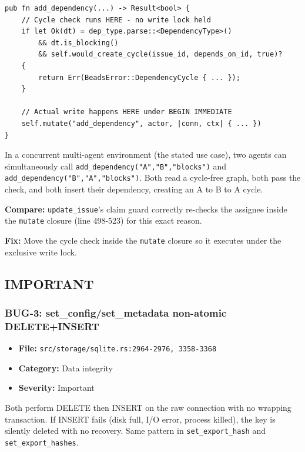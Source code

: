 \documentclass[twocolumn,10pt,letterpaper]{article}
\begin{document}
\begin{lstlisting}
pub fn add_dependency(...) -> Result<bool> {
    // Cycle check runs HERE - no write lock held
    if let Ok(dt) = dep_type.parse::<DependencyType>()
        && dt.is_blocking()
        && self.would_create_cycle(issue_id, depends_on_id, true)?
    {
        return Err(BeadsError::DependencyCycle { ... });
    }

    // Actual write happens HERE under BEGIN IMMEDIATE
    self.mutate("add_dependency", actor, |conn, ctx| { ... })
}
\end{lstlisting}

In a concurrent multi-agent environment (the stated use case), two agents can simultaneously call \texttt{add\_dependency("A","B","blocks")} and \texttt{add\_dependency("B","A","blocks")}. Both read a cycle-free graph, both pass the check, and both insert their dependency, creating an A to B to A cycle.


\textbf{Compare:} \texttt{update\_issue}'s claim guard correctly re-checks the assignee inside the \texttt{mutate} closure (line 498-523) for this exact reason.


\textbf{Fix:} Move the cycle check inside the \texttt{mutate} closure so it executes under the exclusive write lock.


\subsection{IMPORTANT}

\subsubsection{BUG-3: set\_config/set\_metadata non-atomic DELETE+INSERT}

\begin{itemize}
\setlength{\itemsep}{0pt}
\setlength{\parskip}{0pt}
  \item \textbf{File:} \texttt{src/storage/sqlite.rs:2964-2976, 3358-3368}
  \item \textbf{Category:} Data integrity
  \item \textbf{Severity:} Important
\end{itemize}

Both perform DELETE then INSERT on the raw connection with no wrapping transaction. If INSERT fails (disk full, I/O error, process killed), the key is silently deleted with no recovery. Same pattern in \texttt{set\_export\_hash} and \texttt{set\_export\_hashes}.
\end{document}
